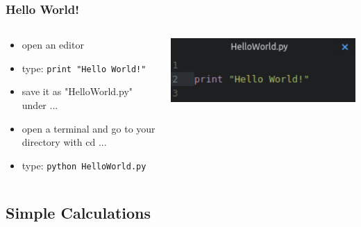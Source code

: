 \documentclass{beamer}
\begin{document}
\begin{frame}
\frametitle{ Hello World!}
	\begin{columns}[T]
		\begin{column}[T]{7cm}
			\begin{itemize}
				\item open an editor 
				\item type: \texttt{print "Hello World!"}
				\item save it as "HelloWorld.py" under ...
				\item open a terminal and go to your directory with cd ...
				\item type: \texttt{python HelloWorld.py}
			\end{itemize}
		\end{column}
		\begin{column}[T]{5cm}
			\includegraphics[width = 1\textwidth]{HelloWorld.pdf}
		\end{column}
	\end{columns}
\end{frame}

\subsection{Simple Calculations}
\end{document}
